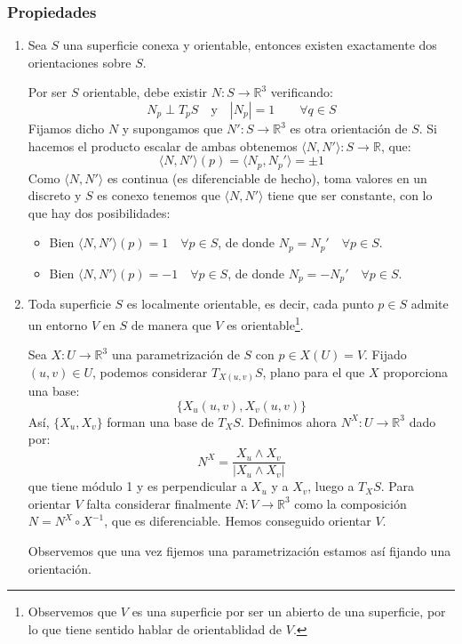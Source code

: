 \subsubsection{Propiedades}
\begin{enumerate}
    \item Sea $S$ una superficie conexa y orientable, entonces existen exactamente dos orientaciones sobre $S$.

        Por ser $S$ orientable, debe existir $N:S\to \mathbb{R}^3$ verificando:
        \begin{equation*}
            N_p\perp T_pS \quad \text{y}\quad |N_p| = 1 \qquad \forall q\in S
        \end{equation*}
        Fijamos dicho $N$ y supongamos que $N':S\to\mathbb{R}^3$  es otra orientación de $S$. Si hacemos el producto escalar de ambas obtenemos $\langle N,N' \rangle :S\to \mathbb{R}$, que:
        \begin{equation*}
            \langle N,N' \rangle (p) = \langle N_p,N_p' \rangle  = \pm 1
        \end{equation*}
        Como $\langle N,N' \rangle $ es continua (es diferenciable de hecho), toma valores en un discreto y $S$ es conexo tenemos que $\langle N,N' \rangle $ tiene que ser constante, con lo que hay dos posibilidades:
        \begin{itemize}
            \item Bien $\langle N,N' \rangle (p) = 1\quad \forall p\in S$, de donde $N_p = N_p'\quad \forall p\in S$.
            \item Bien $\langle N,N' \rangle (p) = -1\quad \forall p\in S$, de donde $N_p = -N_p'\quad \forall p\in S$.
        \end{itemize}
    \item Toda superficie $S$ es localmente orientable, es decir, cada punto $p\in S$ admite un entorno $V$ en $S$ de manera que $V$ es orientable\footnote{Observemos que $V$ es una superficie por ser un abierto de una superficie, por lo que tiene sentido hablar de orientablidad de $V$.}.

        Sea $X:U\to\mathbb{R}^3$ una parametrización de $S$ con $p\in X(U) = V$. Fijado $(u,v)\in U$, podemos considerar $T_{X(u,v)}S$, plano para el que $X$ proporciona una base:
        \begin{equation*}
            \{X_u(u,v), X_v(u,v)\}
        \end{equation*}
        Así, $\{X_u,X_v\}$ forman una base de $T_XS$. Definimos ahora $N^X:U\to\mathbb{R}^3$ dado por:
        \begin{equation*}
            N^X = \frac{X_u\land X_v}{|X_u\land X_v|}
        \end{equation*}
        que tiene módulo 1 y es perpendicular a $X_u$ y a $X_v$, luego a $T_XS$. Para orientar $V$ falta considerar finalmente $N:V\to\mathbb{R}^3$ como la composición $N = N^X\circ X^{-1}$, que es diferenciable. Hemos conseguido orientar $V$.

        Observemos que una vez fijemos una parametrización estamos así fijando una orientación.
\end{enumerate}


